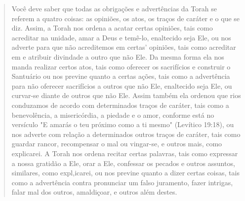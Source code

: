 \begin{quote}
Você deve saber que todas as obrigações e advertências da Torah se
referem a quatro coisas: as opiniões, os atos, os traços de caráter e o
que se diz. Assim, a Torah nos ordena a acatar certas opiniões, tais
como acreditar na unidade, amar a Deus e temê-lo, enaltecido seja Ele,
ou nos adverte para que não acreditemos em certas' opiniões, tais como
acreditar em e atribuir divinda­de a outro que não Ele. Da mesma forma
ela nos manda realizar certos atos, tais como oferecer os sacrifícios e
construir o Santuário ou nos previne quanto a certas ações, tais como a
advertência para não oferecer sacrifícios a outros que não Ele,
enaltecido seja Ele, ou curvar-se diante de outros que não Ele. As­sim
também ela ordenou que rios conduzamos de acordo com determinados traços
de caráter, tais como a benevolência, a misericórdia, a piedade e o
amor, conforme está no versículo "E amarás o teu próximo como a ti
mesmo" (Leví­tico 19:18), ou nos adverte com relação a determinados
outros traços de cará­ter, tais como guardar rancor, recompensar o mal
ou vingar-se, e outros mais, como explicarei. A Torah nos ordena recitar
certas palavras, tais como expres­sar a nossa gratidão a Ele, orar a
Ele, confessar os pecados e outros assuntos, similares, como 
expl,icarei, ou nos previne quanto a dizer certas
coisas, tais co­mo a advertência contra pronunciar um falso juramento,
fazer intrigas, falar mal dos outros, amaldiçoar, e outros além destes.


\end{quote}
